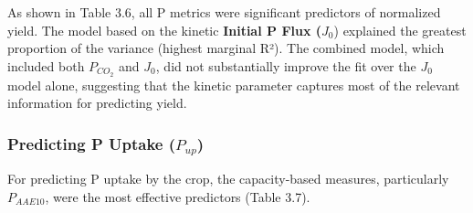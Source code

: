 \documentclass[
  a4paper,
]{article}
\begin{document}
As shown in Table 3.6, all P metrics were significant predictors of
normalized yield. The model based on the kinetic \textbf{Initial P Flux
(}\(J_0\)) explained the greatest proportion of the variance (highest
marginal R²). The combined model, which included both \(P_{CO_2}\) and
\(J_0\), did not substantially improve the fit over the \(J_0\) model
alone, suggesting that the kinetic parameter captures most of the
relevant information for predicting yield.

\subsubsection{\texorpdfstring{Predicting P Uptake
(\(P_{up}\))}{Predicting P Uptake (P\_\{up\})}}\label{predicting-p-uptake-p_up}

For predicting P uptake by the crop, the capacity-based measures,
particularly \(P_{AAE10}\), were the most effective predictors (Table
3.7).
\end{document}
